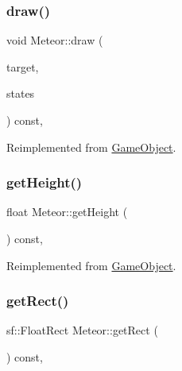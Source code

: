 \subsubsection{\texorpdfstring{draw()}{draw()}}
{\footnotesize\ttfamily void Meteor\+::draw (\begin{DoxyParamCaption}\item[{sf\+::\+Render\+Target \&}]{target,  }\item[{sf\+::\+Render\+States}]{states }\end{DoxyParamCaption}) const\hspace{0.3cm}{\ttfamily [override]}, {\ttfamily [virtual]}}



Reimplemented from \hyperlink{class_game_object_aa6d7650a920e2dd79b0125560faf3807}{Game\+Object}.

\mbox{\label{class_meteor_a967d79131976578613c0387bd6569aa6}} 
\subsubsection{\texorpdfstring{get\+Height()}{getHeight()}}
{\footnotesize\ttfamily float Meteor\+::get\+Height (\begin{DoxyParamCaption}{ }\end{DoxyParamCaption}) const\hspace{0.3cm}{\ttfamily [override]}, {\ttfamily [virtual]}}



Reimplemented from \hyperlink{class_game_object_a927400453a0989e2f5b765031f4d861c}{Game\+Object}.

\mbox{\label{class_meteor_a7db7163153835475758d65e983086120}} 
\subsubsection{\texorpdfstring{get\+Rect()}{getRect()}}
{\footnotesize\ttfamily sf\+::\+Float\+Rect Meteor\+::get\+Rect (\begin{DoxyParamCaption}{ }\end{DoxyParamCaption}) const\hspace{0.3cm}{\ttfamily [override]}, {\ttfamily [virtual]}}



